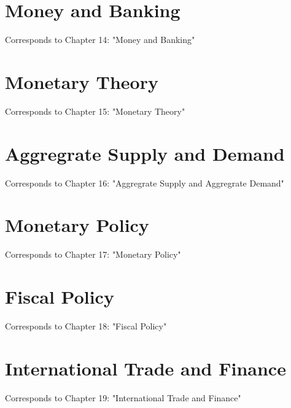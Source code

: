 \documentclass[12pt, a4paper]{article}
\theoremstyle{definition}
\begin{document}
\section{Money and Banking}
Corresponds to Chapter 14: "Money and Banking"

\newpage

\section{Monetary Theory}
Corresponds to Chapter 15: "Monetary Theory"

\newpage

\section{Aggregrate Supply and Demand}
Corresponds to Chapter 16: "Aggregrate Supply and Aggregrate Demand"

\newpage

\section{Monetary Policy}
Corresponds to Chapter 17: "Monetary Policy"

\newpage

\section{Fiscal Policy}
Corresponds to Chapter 18: "Fiscal Policy"

\newpage

\section{International Trade and Finance}
Corresponds to Chapter 19: "International Trade and Finance"

\newpage
\end{document}
